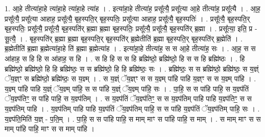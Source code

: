\documentclass[17pt]{extarticle}
\begin{document}
1. आ॒हे तीत्या॑हा॒हे त्या॑हा॒हे त्या॑हा॒हे त्या॑ह । . इत्या॑हा॒हे तीत्या॑ह॒ प्रसू᳚त्यै॒ प्रसू᳚त्या आ॒हे तीत्या॑ह॒ प्रसू᳚त्यै । . आ॒ह॒ प्रसू᳚त्यै॒ प्रसू᳚त्या आहाह॒ प्रसू᳚त्यै॒ बृह॒स्पति॒र् बृह॒स्पतिः॒ प्रसू᳚त्या आहाह॒ प्रसू᳚त्यै॒ बृह॒स्पतिः॑ । . प्रसू᳚त्यै॒ बृह॒स्पति॒र् बृह॒स्पतिः॒ प्रसू᳚त्यै॒ प्रसू᳚त्यै॒ बृह॒स्पति॑र् ब्र॒ह्मा ब्र॒ह्मा बृह॒स्पतिः॒ प्रसू᳚त्यै॒ प्रसू᳚त्यै॒ बृह॒स्पति॑र् ब्र॒ह्मा । . प्रसू᳚त्या॒ इति॒ प्र - सू॒त्यै॒ । . बृह॒स्पति॑र् ब्र॒ह्मा ब्र॒ह्मा बृह॒स्पति॒र् बृह॒स्पति॑र् ब्र॒ह्मेतीति॑ ब्र॒ह्मा बृह॒स्पति॒र् बृह॒स्पति॑र् ब्र॒ह्मेति॑ । . ब्र॒ह्मेतीति॑ ब्र॒ह्मा ब्र॒ह्मेत्या॑हा॒हे ति॑ ब्र॒ह्मा ब्र॒ह्मेत्या॑ह । . इत्या॑हा॒हे तीत्या॑ह॒ स स आ॒हे तीत्या॑ह॒ सः । . आ॒ह॒ स स आ॑हाह॒ स हि हि स आ॑हाह॒ स हि । . स हि हि स स हि ब्रह्मि॑ष्ठो॒ ब्रह्मि॑ष्ठो॒ हि स स हि ब्रह्मि॑ष्ठः । . हि ब्रह्मि॑ष्ठो॒ ब्रह्मि॑ष्ठो॒ हि हि ब्रह्मि॑ष्ठः॒ स स ब्रह्मि॑ष्ठो॒ हि हि ब्रह्मि॑ष्ठः॒ सः । . ब्रह्मि॑ष्ठः॒ स स ब्रह्मि॑ष्ठो॒ ब्रह्मि॑ष्ठः॒ स य॒ज्ञ्ं ॅय॒ज्ञ्ꣳ स ब्रह्मि॑ष्ठो॒ ब्रह्मि॑ष्ठः॒ स य॒ज्ञ्म् । . स य॒ज्ञ्ं ॅय॒ज्ञ्ꣳ स स य॒ज्ञ्म् पा॑हि पाहि य॒ज्ञ्ꣳ स स य॒ज्ञ्म् पा॑हि । . य॒ज्ञ्म् पा॑हि पाहि य॒ज्ञ्ं ॅय॒ज्ञ्म् पा॑हि॒ स स पा॑हि य॒ज्ञ्ं ॅय॒ज्ञ्म् पा॑हि॒ सः । . पा॒हि॒ स स पा॑हि पाहि॒ स य॒ज्ञ्प॑तिं ॅय॒ज्ञ्प॑तिꣳ॒॒ स पा॑हि पाहि॒ स य॒ज्ञ्प॑तिम् । . स य॒ज्ञ्प॑तिं ॅय॒ज्ञ्प॑तिꣳ॒॒ स स य॒ज्ञ्प॑तिम् पाहि पाहि य॒ज्ञ्प॑तिꣳ॒॒ स स य॒ज्ञ्प॑तिम् पाहि । . य॒ज्ञ्प॑तिम् पाहि पाहि य॒ज्ञ्प॑तिं ॅय॒ज्ञ्प॑तिम् पाहि॒ स स पा॑हि य॒ज्ञ्प॑तिं ॅय॒ज्ञ्प॑तिम् पाहि॒ सः । . य॒ज्ञ्प॑ति॒मिति॑ य॒ज्ञ् - प॒ति॒म् । . पा॒हि॒ स स पा॑हि पाहि॒ स माम् माꣳ स पा॑हि पाहि॒ स माम् । . स माम् माꣳ स स माम् पा॑हि पाहि॒ माꣳ स स माम् पा॑हि । \newline
\end{document}
